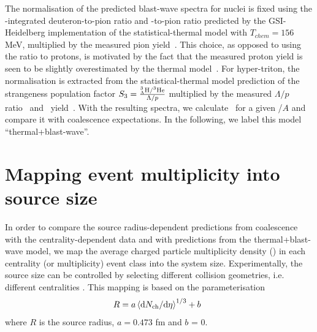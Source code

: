 \documentclass[%
 reprint,
 amsmath,amssymb,
 aps,
]{revtex4-1}
\begin{document}
The normalisation of the predicted blast-wave spectra for nuclei is fixed using the \pt-integrated deuteron-to-pion ratio and \hethree-to-pion ratio predicted by the GSI-Heidelberg implementation of the statistical-thermal model with $T_{chem} = 156$ MeV, multiplied by the measured pion yield~\cite{Abelev:2013vea}. 
This choice, as opposed to using the ratio to protons, is motivated by the fact that the measured proton yield is seen to be slightly overestimated by the thermal model~\cite{Abelev:2012wca}.
For hyper-triton, the normalisation is extracted from the statistical-thermal model prediction of the strangeness population factor \mbox{$S_{3} = { _{\Lambda}^{3}\mathrm{H} / ^{3}{\mathrm{He}} \over \Lambda/p}$} multiplied by the measured $\Lambda/p$ ratio~\cite{Abelev:2013vea,Abelev:2013xaa} and \hethree~yield~\cite{ALICE:deuteronppPbPb2015}. 
With the resulting spectra, we calculate \bA~for a given \pt/$A$ and compare it with coalescence expectations. 
In the following, we label this model ``thermal+blast-wave''.

\section{Mapping event multiplicity into source size} \label{sec:radiiParamet}
In order to compare the source radius-dependent predictions from coalescence with the centrality-dependent data and with predictions from the thermal+blast-wave model, we map the average charged particle multiplicity density (\avdNdeta) in each centrality (or multiplicity) event class into the system size. 
Experimentally, the source size can be controlled by selecting different collision geometries, i.e. different centralities \cite{Abelev:2013qoq}. 
This mapping is based on the parameterisation
%
\begin{equation}
R = a \left<\mathrm{d}N_\mathrm{ch}/\mathrm{d}\eta\right>^{1/3} + b\;\;
\label{eq:radiusParameterisation}
\end{equation}
%
\noindent where $R$ is the source radius, $a = 0.473$ fm and $b$ = 0. 
\end{document}
